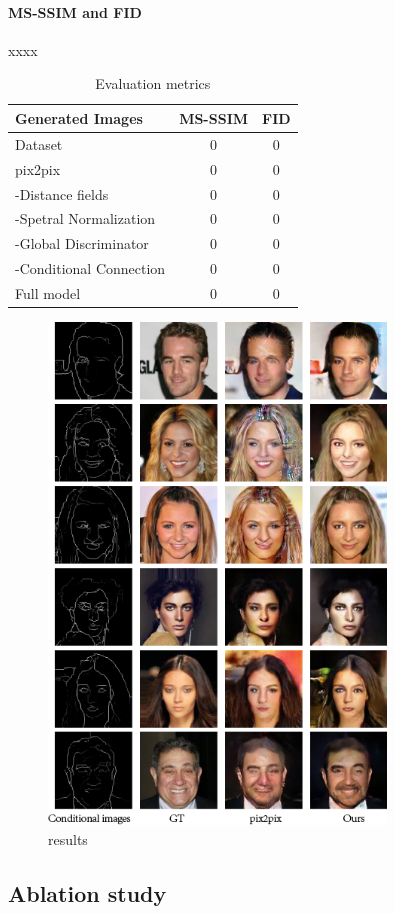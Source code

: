 \paragraph{MS-SSIM and FID} xxxx
%
%
\begin{table}[h]
	\centering	
	\label{tab:evaluation_metrics}
	\caption{Evaluation metrics }
	\begin{tabular}{|l|c|c|}\hline
		Generated Images & MS-SSIM & FID\\\hline
		Dataset & $0$ & $0$\\
		pix2pix & $0$ & $0$ \\
		-Distance fields & $0$ & $0$\\
		-Spetral Normalization & $0$ & $0$\\
		-Global Discriminator & $0$ & $0$ \\
		-Conditional Connection & $0$ & $0$ \\
		Full model & $0$ & $0$ \\\hline
	\end{tabular}
\end{table}
%
%
\begin{figure}
	\label{fig:results}
	\includegraphics[width=0.8\textwidth]{figures/results}
	\caption{results}
\end{figure}
%
%
\subsection{Ablation study}
